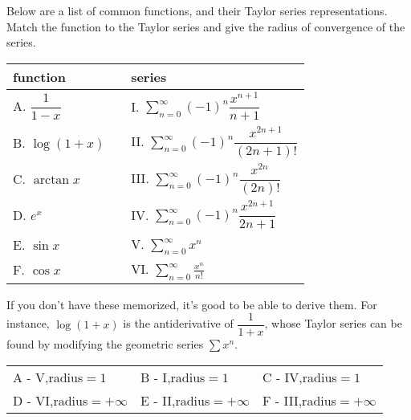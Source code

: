 \begin{Mquestion}
Below are a list of common functions, and their Taylor series representations. Match the function to the Taylor series and give the radius of convergence of the series.
\begin{center}
\begin{tabular}{l c l}
function & \qquad & series\\
\hline
A. $\dfrac{1}{1-x}$&&I. $\displaystyle\sum_{n=0}^\infty(-1)^n\dfrac{x^{n+1}}{n+1}$\\[20pt]
B. $\log(1+x)$&&II. $\displaystyle\sum_{n=0}^\infty(-1)^n\dfrac{x^{2n+1}}{(2n+1)!}$\\[20pt]
C. $\arctan x$&&III. $\displaystyle\sum_{n=0}^\infty(-1)^n\dfrac{x^{2n}}{(2n)!}$\\[20pt]
D. $e^x$&&IV. $\displaystyle\sum_{n=0}^\infty(-1)^n\dfrac{x^{2n+1}}{2n+1}$\\[20pt]
E. $\sin x$ &&V. $\displaystyle\sum_{n=0}^\infty x^n$\\[20pt]
F. $\cos x$ &&VI. $\displaystyle\sum_{n=0}^\infty \frac{x^n}{n!}$
\end{tabular}
\end{center}
\end{Mquestion}
\begin{hint}
If you don't have these memorized, it's good to be able to derive them. For instance, $\log(1+x)$ is the antiderivative of $\dfrac{1}{1+x}$, whose Taylor series can be found by modifying the geometric series $\sum x^n$.
\end{hint}
\begin{answer}
\begin{center}
\begin{tabular}{l l l}
A - V,\quad radius$=1$ &
B - I,\quad radius$=1$ &
C - IV,\quad radius$=1$ \\
D - VI,\quad radius$=+\infty$ &
E - II,\quad radius$=+\infty$ &
F - III,\quad radius$=+\infty$
\end{tabular}
\end{center}
\end{answer}
